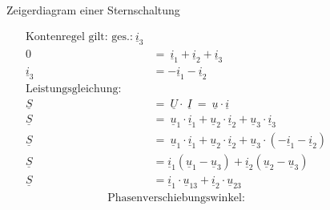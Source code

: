 \begin{enumerate}[label=\alph*)]
\begin{figure}[!h]
\begin{minipage}[ct]{.4\linewidth}
\begin{center}
            \end{center}
            \caption{Zeigerdiagram einer Sternschaltung}\label{img/2.2.1.2}
          \end{minipage}
        \end{figure}

        \begin{align*}
          \text{Kontenregel gilt: ges.:}\  \underline{i}_3                                                                                                                 \\
          0               & =\ \underline{i}_1 + \underline{i}_2 + \underline{i}_3                                                                                         \\
          \underline{i}_3 & = - \underline{i}_1 - \underline{i}_2                                                                                                          \\
          \text{Leistungsgleichung:}                                                                                                                                       \\
          \underline{S}   & =\ \underline{U} \cdot\ \underline{I}\ =\ \underline{u} \cdot \underline{i}                                                                    \\
          \underline{S}   & =\ \underline{u}_1 \cdot \underline{i}_1 + \underline{u}_2 \cdot \underline{i}_2 + \underline{u}_3 \cdot \underline{i}_3                       \\
          \underline{S}   & =\ \underline{u}_1 \cdot \underline{i}_1 + \underline{u}_2 \cdot \underline{i}_2 + \underline{u}_3 \cdot (- \underline{i}_1 - \underline{i}_2) \\
          \underline{S}   & = \underline{i}_1(\underline{u}_1 - \underline{u}_3) + \underline{i}_2(\underline{u}_2 - \underline{u}_3)                                      \\
          \underline{S}   & = \underline{i}_1\cdot\underline{u}_{13} + \underline{i}_2\cdot\underline{u}_{23}
        \end{align*}
        \begin{align*}
          \text{Phasenverschiebungswinkel:}                                          \\

\end{align*}
\end{enumerate}

